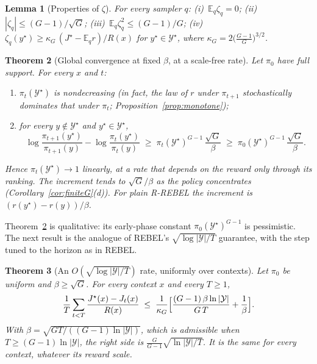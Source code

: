 \documentclass[11pt]{article}
\newtheorem{theorem}{Theorem}
\newtheorem{lemma}[theorem]{Lemma}
\theoremstyle{definition}
\theoremstyle{remark}
\newcommand{\E}{\mathbb{E}}
\newcommand{\cY}{\mathcal{Y}}
\newcommand{\1}{\mathbb{1}}
\newcommand{\rr}{R-REBEL}
\begin{document}
\begin{lemma}[Properties of $\zeta$]\label{lem:zeta}
For every sampler $q$:
(i)~$\E_q\zeta_q=0$;
(ii)~$|\zeta_q|\le(G-1)/\sqrt G$;
(iii)~$\E_q\zeta_q^2\le(G-1)/G$;
(iv)~$\zeta_q(y^\star)\ge\kappa_G\,(J^\star-\E_qr)/R(x)$ for $y^\star\in\cY^\star$, where
$\kappa_G=2\bigl(\frac{G-1}{G}\bigr)^{3/2}$.
\end{lemma}

\begin{theorem}[Global convergence at fixed $\beta$, at a scale-free rate]\label{thm:global}
Let $\pi_0$ have full support. For every $x$ and $t$:
\begin{enumerate}[label=(\roman*),itemsep=1pt,topsep=2pt]
\item $\pi_t(\cY^\star)$ is nondecreasing (in fact, the law of $r$ under $\pi_{t+1}$
stochastically dominates that under $\pi_t$; Proposition~\ref{prop:monotone});
\item for every $y\notin\cY^\star$ and $y^\star\in\cY^\star$,
\[
  \log\frac{\pi_{t+1}(y^\star)}{\pi_{t+1}(y)}-\log\frac{\pi_t(y^\star)}{\pi_t(y)}
  \;\ge\;\pi_t(\cY^\star)^{G-1}\,\frac{\sqrt G}{\beta}\;\ge\;\pi_0(\cY^\star)^{G-1}\,\frac{\sqrt G}{\beta}.
\]
\end{enumerate}
Hence $\pi_t(\cY^\star)\to1$ linearly, at a rate that depends on the reward only
through its \emph{ranking}. The increment tends to $\sqrt G/\beta$ as the policy
concentrates (Corollary~\ref{cor:finiteG}(d)). For plain \rr{} the increment is
$(r(y^\star)-r(y))/\beta$.
\end{theorem}

Theorem~\ref{thm:global} is qualitative: its early-phase constant
$\pi_0(\cY^\star)^{G-1}$ is pessimistic. The next result is the analogue of REBEL's
$\sqrt{\log|\cY|/T}$ guarantee, with the step tuned to the horizon as in REBEL.

\begin{theorem}[An $O(\sqrt{\log|\cY|/T})$ rate, uniformly over contexts]\label{thm:rate}
Let $\pi_0$ be uniform and $\beta\ge\sqrt G$. For every context $x$ and every $T\ge1$,
\[
  \frac1T\sum_{t<T}\frac{J^\star(x)-J_t(x)}{R(x)}\;\le\;\frac{1}{\kappa_G}\Bigl[\frac{(G-1)\,\beta\ln|\cY|}{G\,T}+\frac1\beta\Bigr].
\]
With $\beta=\sqrt{GT/((G-1)\ln|\cY|)}$, which is admissible when
$T\ge(G-1)\ln|\cY|$, the right side is $\frac{G}{G-1}\sqrt{\ln|\cY|/T}$. It is the
same for every context, whatever its reward scale.
\end{theorem}
\end{document}
